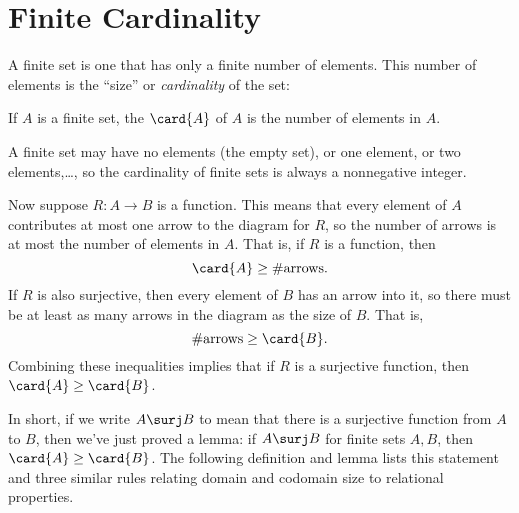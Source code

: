 \begin{problems}
\practiceproblems
{}

\classproblems
{}

\homeworkproblems

\examproblems
{}
\end{problems}


\section{Finite Cardinality}\label{mappingrule_sec}

A finite set is one that has only a finite number of elements.  This
number of elements is the ``size'' or \emph{cardinality} of the set:
\begin{definition}\label{fin_card_def}
If $A$ is a finite set, the  $\card{A}$ of $A$ is
the number of elements in $A$.
\end{definition}
A finite set may have no elements (the empty set), or one element, or
two elements,\dots, so the cardinality of finite sets is always a
nonnegative integer.

Now suppose $R:A \to B$ is a function.  This means that every element
of $A$ contributes at most one arrow to the diagram for $R$, so the
number of arrows is at most the number of elements in $A$.  That is,
if $R$ is a function, then
\[
\card{A} \geq \#\text{arrows}.
\]
If $R$ is also surjective, then every element of $B$ has an arrow into
it, so there must be at least as many arrows in the diagram as the
size of $B$.  That is,
\[
\#\text{arrows} \geq \card{B}.
\]
Combining these inequalities implies that if $R$ is a surjective
function, then $\card{A} \geq \card{B}$.

In short, if we write $A \surj B$ to mean that there is a surjective
function from $A$ to $B$, then we've just proved a lemma: if $A \surj
B$ for finite sets $A,B$, then $\card{A} \geq \card{B}$.  The
following definition and lemma lists this statement and three similar
rules relating domain and codomain size to relational properties.

